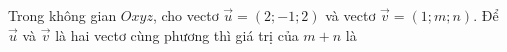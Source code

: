\begin{ex}
Trong không gian $Oxyz$, cho vectơ $\vec{u}=(2;-1;2)$ và vectơ $\vec{v}=(1;m;n)$. Để $\vec{u}$ và $\vec{v}$ là hai vectơ cùng phương thì giá trị của $m+n$ là
\end{ex}
